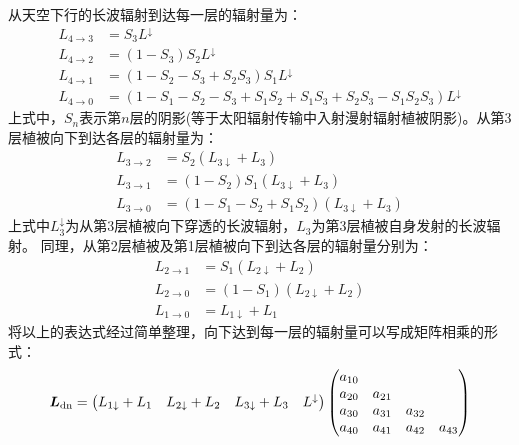 从天空下行的长波辐射到达每一层的辐射量为：
\begin{equation}
  \begin{aligned} L_{4 \rightarrow 3} &=S_{3} L^\downarrow \\ L_{4 \rightarrow 2} &=\left(1-S_{3}\right) S_{2} L^\downarrow
    \\ L_{4 \rightarrow 1} &=\left(1-S_{2}-S_{3}+S_{2} S_{3}\right) S_{1} L^\downarrow \\
  L_{4 \rightarrow 0} &=\left(1-S_{1}-S_{2}-S_{3}+S_{1} S_{2}+S_{1} S_{3}+S_{2} S_{3}-S_{1} S_{2} S_{3}\right) L^\downarrow \end{aligned}
\end{equation}
上式中，$S_n$表示第$n$层的阴影(等于太阳辐射传输中入射漫射辐射植被阴影)。从第3层植被向下到达各层的辐射量为：
\begin{equation}
  \begin{aligned}
    L_{3 \rightarrow 2} &=S_{2}\left(L_{3 \downarrow}+L_{3}\right) \\[1ex]
    L_{3 \rightarrow 1} &=\left(1-S_{2}\right) S_{1}\left(L_{3 \downarrow}+L_{3}\right) \\[1ex]
    L_{3 \rightarrow 0} &=\left(1-S_{1}-S_{2}+S_{1} S_{2}\right)\left(L_{3 \downarrow}+L_{3}\right)
  \end{aligned}
\end{equation}
上式中$L_3 ^\downarrow$为从第3层植被向下穿透的长波辐射，$L_3$为第3层植被自身发射的长波辐射。
同理，从第2层植被及第1层植被向下到达各层的辐射量分别为：
\begin{equation}
  \begin{aligned}
    L_{2 \rightarrow 1} &=S_{1}\left(L_{2 \downarrow}+L_{2}\right) \\[1ex]
    L_{2 \rightarrow 0} &=\left(1-S_{1}\right)\left(L_{2 \downarrow}+L_{2}\right) \\[1ex]
    L_{1 \rightarrow 0} &=L_{1 \downarrow}+L_{1}
  \end{aligned}
\end{equation}
将以上的表达式经过简单整理，向下达到每一层的辐射量可以写成矩阵相乘的形式：
\begin{equation}
  \boldsymbol{L}_{\rm dn}=\left(\begin{matrix}L_{1\downarrow}+L_1&L_{2\downarrow}+L_2&L_{3\downarrow}+L_3&L^\downarrow\\
  \end{matrix}\right)\left(\begin{matrix}a_{10}&&&\\a_{20}&a_{21}&&
  \\a_{30}&a_{31}&a_{32}&\\a_{40}&a_{41}&a_{42}&a_{43}\\\end{matrix}\right)
\end{equation}

